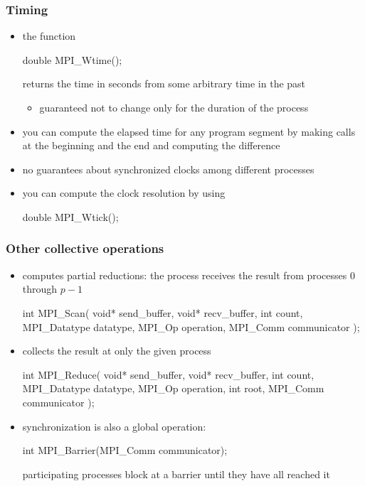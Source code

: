 %
%



\begin{frame}[fragile]
%
  \frametitle{Timing}
%
  \begin{itemize}
%
  \item the function
    \begin{C}
double MPI_Wtime();
    \end{C}
    returns the time in seconds from some arbitrary time in the past
    \begin{itemize}
    \item guaranteed not to change only for the duration of the process
    \end{itemize}
%
  \item you can compute the elapsed time for any program segment by making calls at the
    beginning and the end and computing the difference
%
  \item no guarantees about synchronized clocks among different processes
%
  \item you can compute the clock resolution by using
    \begin{C}
double MPI_Wtick();
    \end{C}
%
  \end{itemize}
%
\end{frame}

\begin{frame}[fragile]
%
  \frametitle{Other collective operations}
%
  \begin{itemize}
%
  \item {} computes partial reductions: the  process receives the
    result from processes 0 through $p-1$
    \begin{C}
int MPI_Scan(
        void* send_buffer, void* recv_buffer,
        int count, MPI_Datatype datatype, MPI_Op operation,
        MPI_Comm communicator
        );
   \end{C}
%
  \item {} collects the result at only the given process 
    \begin{C}
int MPI_Reduce(
        void* send_buffer, void* recv_buffer,
        int count, MPI_Datatype datatype, MPI_Op operation,
        int root, MPI_Comm communicator
        );
   \end{C}
%
   \item synchronization is also a global operation:
    \begin{C}
int MPI_Barrier(MPI_Comm communicator);
   \end{C}
%
   participating processes block at a barrier until they have all reached it
%
  \end{itemize}
%
\end{frame}

